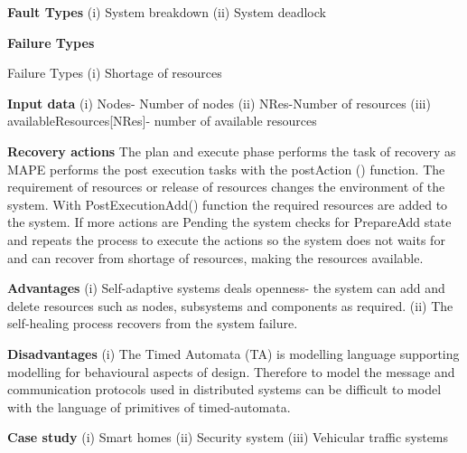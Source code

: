 \begin{compactitem}
\item[\textbf{Fault Types}]
(i) System breakdown (ii) System deadlock
\item[\textbf{Failure Types}]

Failure Types (i) Shortage of resources
\item[\textbf{Input data}] 
(i) Nodes- Number of nodes (ii) NRes-Number of resources
(iii) availableResources[NRes]- number of available resources


\item[\textbf{Recovery actions}]
The plan and execute phase performs the task of recovery as MAPE performs the post execution tasks with the postAction () function. The requirement of resources or release of resources changes the environment of the system. With PostExecutionAdd() function the required resources are added to the system. If more actions are Pending the system checks for PrepareAdd state and repeats the process to execute the actions so the system does not waits for and can recover from shortage of resources, making the resources available.


\item[\textbf{Advantages}] 
(i) Self-adaptive systems deals openness- the system can add and delete resources such as nodes, subsystems and components as required.
(ii) The self-healing process recovers from the system failure.

\item[\textbf{Disadvantages}] 
(i) The Timed Automata (TA) is modelling language supporting modelling for behavioural aspects of design. Therefore to model the message and communication protocols used in distributed systems can be difficult to model with the language of primitives of timed-automata.

\item[\textbf{Case study}] 
(i) Smart homes (ii) Security system (iii) Vehicular traffic systems

\end{compactitem}


